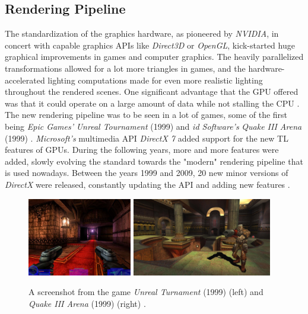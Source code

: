 \clearpage

\subsection*{Rendering Pipeline} \label{subsec-rendering-pipeline}

The standardization of the graphics hardware, as pioneered by \emph{NVIDIA}, in concert with capable 
graphics \ac{API}s like \emph{Direct3D} or \emph{OpenGL}, kick-started huge graphical improvements in 
games and computer graphics. The heavily parallelized transformations allowed for a lot more triangles 
in games, and the hardware-accelerated lighting computations made for even more realistic lighting 
throughout the rendered scenes. One significant advantage that the \ac{GPU} offered was that it could 
operate on a large amount of data while not stalling the \ac{CPU} \cite{Fenno2024}.\\

\noindent
The new rendering pipeline was to be seen in a lot of games, some of the first being \emph{Epic Games'} 
\emph{Unreal Tournament} (1999) and \emph{id Software's} \emph{Quake III Arena} (1999) \cite{UnrealTurnament, 
Quake3Arena}. \emph{Microsoft's} multimedia \ac{API} \emph{DirectX 7} added support for the new \ac{TL} 
features of \ac{GPU}s. During the following years, more and more features were added, slowly evolving the 
standard towards the "modern" rendering pipeline that is used nowadays. Between the years 1999 and 2009,
20 new minor versions of \emph{DirectX} were released, constantly updating the \ac{API} and adding new 
features \cite{WikiDirectX}.

\begin{figure}[h]
    \centering
    \includegraphics[width=172.5px]{images/graphics/unreal-turnament.jpg}
    \includegraphics[width=230px]{images/graphics/quake-iii-arena.jpg}
    \caption{A screenshot from the game \emph{Unreal Turnament} (1999) (left) and \emph{Quake III Arena} (1999) 
    (right) \cite{GamespotUnrealTurnament, GameWatcher2006}.}
    \label{fig:unreal-turnament-quake-arena}
\end{figure}


